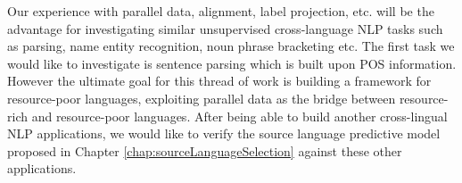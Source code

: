 Our experience with parallel data, alignment, label projection, etc. will be the advantage for investigating similar unsupervised cross-language NLP tasks such as parsing, name entity recognition, noun phrase bracketing etc. The first task we would like to investigate is sentence parsing which is built upon POS information. However the ultimate goal for this thread of work is building a framework for resource-poor languages, exploiting parallel data as the bridge between resource-rich and resource-poor languages. After being able to build another cross-lingual NLP applications, we would like to verify the source language predictive model proposed in Chapter \ref{chap:sourceLanguageSelection} against these other applications. 


